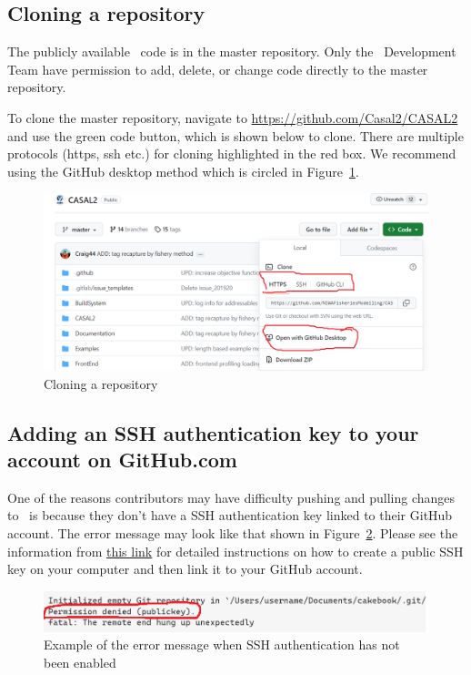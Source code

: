 \subsection{Cloning a repository}

The publicly available \CNAME\ code is in the master repository. Only the \CNAME\ Development Team have permission to add, delete, or change code directly to the master repository. 

To clone the master repository, navigate to \url{https://github.com/Casal2/CASAL2} and use the green code button, which is shown below to clone. There are multiple protocols (https, ssh etc.) for cloning highlighted in the red box. We recommend using the GitHub desktop method which is circled in Figure~\ref{fig:clone}.

\begin{figure}[H]
	\centering
	\includegraphics[scale=0.6]{Figures/clone_repo.png}
	\caption{Cloning a repository}\label{fig:clone}
\end{figure}


\subsection{Adding an SSH authentication key to your account on GitHub.com}

One of the reasons contributors may have difficulty pushing and pulling changes to \CNAME\ is because they don't have a SSH authentication key linked to their GitHub account. The error message may look like that shown in Figure~\ref{fig:permissiondenied}. Please see the information from \href{https://docs.github.com/en/authentication/connecting-to-github-with-ssh/adding-a-new-ssh-key-to-your-github-account}{this link} for detailed instructions on how to create a public SSH key on your computer and then link it to your GitHub account.

\begin{figure}[H]
	\centering
	\includegraphics[scale=0.6]{Figures/permissiondenied.png}
	\caption{Example of the error message when SSH authentication has not been enabled}\label{fig:permissiondenied}
\end{figure}

